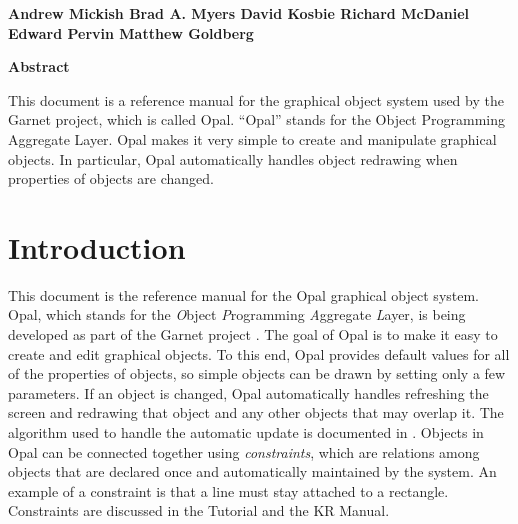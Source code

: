 \begin{titlepage}
\begin{titlebox}
\vspace{0.6 inch}

{\bf Andrew Mickish
Brad A. Myers
David Kosbie
Richard McDaniel
Edward Pervin
Matthew Goldberg}
\vspace{0.3 line}
\value{date}
\end{titlebox}
\vspace{0.5 inch}
\begin{center}
{\bf Abstract}\end{center}
\begin{text}
This document is a reference manual for the graphical object system used by
the Garnet project, which is called Opal.  ``Opal'' stands for the Object
Programming Aggregate Layer.  Opal makes it very simple to create and
manipulate graphical objects.  In particular, Opal automatically handles
object redrawing when properties of objects are changed.

\vspace{0.5 inch}

\end{text}
\end{titlepage}




\chapter{Introduction}

This document is the reference manual for the Opal graphical object system.
Opal, which stands for the {\it O}bject {\it P}rogramming {\it A}ggregate {\it L}ayer,
is being developed as part of the Garnet project \cite{garnet}.  The
goal of Opal is to make it easy to create and edit graphical objects.  To
this end, Opal provides default values for all of the properties of
objects, so simple objects can be drawn by setting only a few parameters.
If an object is changed, Opal automatically handles refreshing the screen
and redrawing that object and any other objects that may overlap it.  The
algorithm used to handle the automatic update is documented in
\cite{OpalUpdate}.  Objects in Opal can be connected together using
{\it constraints}, which are relations among objects that are declared once
and automatically maintained by the system.  An example of a constraint is
that a line must stay attached to a rectangle.  Constraints are discussed in
the Tutorial and the KR Manual.

